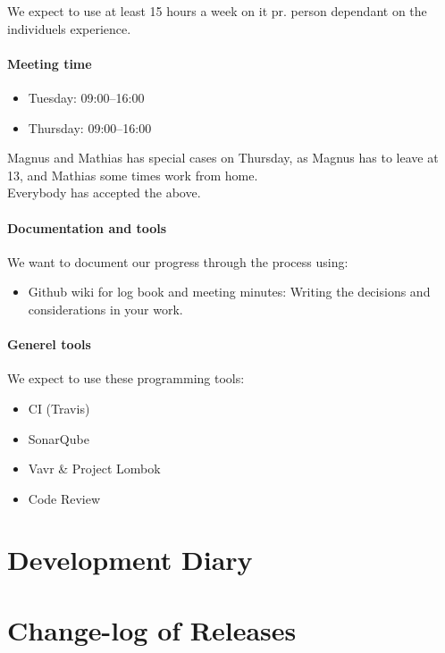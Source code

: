 \documentclass[11pt]{article}
\begin{document}
We expect to use at least 15 hours a week on it pr. person dependant on the individuels experience.

\paragraph{Meeting time}

\begin{itemize}
    \item Tuesday: 09:00--16:00
    \item Thursday: 09:00--16:00
\end{itemize}
Magnus and Mathias has special cases on Thursday, as Magnus has to leave at 13, and Mathias some times work from home. \\
Everybody has accepted the above.

\paragraph{Documentation and tools}
We want to document our progress through the process using:
\begin{itemize}
    \item Github wiki for log book and meeting minutes: Writing the decisions and considerations in your work.
\end{itemize}

\paragraph{Generel tools}
We expect to use these programming tools:
\begin{itemize}
    \item CI (Travis)
    \item SonarQube
    \item Vavr \& Project Lombok
    \item Code Review
\end{itemize}

\section{Development Diary}

\section{Change-log of Releases}
\end{document}
